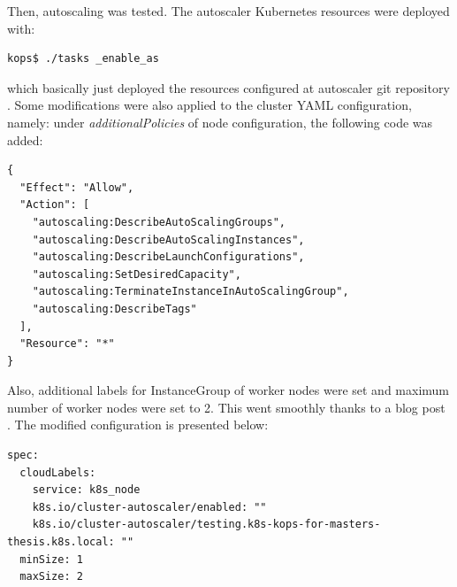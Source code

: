 Then, autoscaling was tested. The autoscaler Kubernetes resources were deployed with:
\begin{lstlisting}[basicstyle=\tiny,caption={Bash command to deploy autoscaker}]
kops$ ./tasks _enable_as
\end{lstlisting}
which basically just deployed the resources configured at autoscaler git repository \cite{as-github}. Some modifications were also applied to the cluster YAML configuration, namely: under \textit{additionalPolicies} of node configuration, the following code was added:
\begin{lstlisting}[basicstyle=\tiny,caption={IAM Policies needed by autoscaler}]
{
  "Effect": "Allow",
  "Action": [
    "autoscaling:DescribeAutoScalingGroups",
    "autoscaling:DescribeAutoScalingInstances",
    "autoscaling:DescribeLaunchConfigurations",
    "autoscaling:SetDesiredCapacity",
    "autoscaling:TerminateInstanceInAutoScalingGroup",
    "autoscaling:DescribeTags"
  ],
  "Resource": "*"
}
\end{lstlisting}
Also, additional labels for InstanceGroup of worker nodes were set and maximum number of worker nodes were set to 2. This went smoothly thanks to a blog post \cite{as-blog}. The modified configuration is presented below:
\begin{lstlisting}[basicstyle=\tiny,caption={Kops cluster YAML configuration needed for autoscaler}]
spec:
  cloudLabels:
    service: k8s_node
    k8s.io/cluster-autoscaler/enabled: ""
    k8s.io/cluster-autoscaler/testing.k8s-kops-for-masters-thesis.k8s.local: ""
  minSize: 1
  maxSize: 2
\end{lstlisting}

